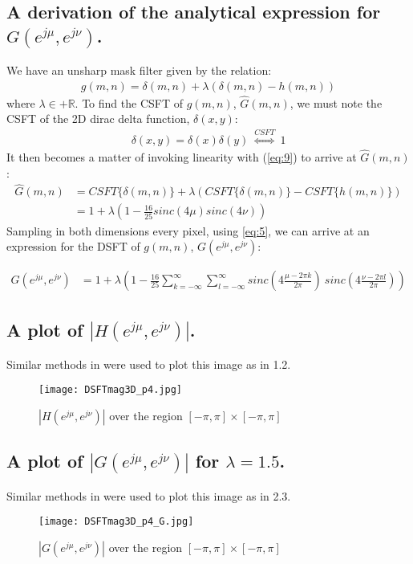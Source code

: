 \documentclass{article}
\begin{document}
\subsection{A derivation of the analytical expression for $G(e^{j \mu}, e^{j \nu})$.}
We have an unsharp mask filter given by the relation:
\begin{align}\label{eq:10}
    g(m,n) = \delta(m,n) + \lambda (\delta(m,n) - h(m,n))
\end{align}
where $\lambda \in \mathbb{+R}$. To find the CSFT of $g(m,n)$, $\hat{G}(m,n)$, we must note the CSFT of the 2D dirac delta function, $\delta(x,y)$:
\begin{align}\label{eq:11}
\delta(x,y) = \delta(x)\delta(y) \  \overset{CSFT}{\Longleftrightarrow} \ 1
\end{align}
It then becomes a matter of invoking linearity with (\ref{eq:9}) to arrive at $\hat{G}(m,n)$:
\begin{align*}
\hat{G}(m,n) &= CSFT\{\delta(m, n)\} + \lambda(CSFT\{\delta(m, n)\} - CSFT\{h(m,n)\}) \\
&= 1 + \lambda (1 - \frac{16}{25} sinc(4 \mu) sinc(4 \nu))
\end{align*}
Sampling in both dimensions every pixel, using \eqref{eq:5}, we can arrive at an expression for the DSFT of $g(m, n)$, $G(e^{j \mu}, e^{j \nu})$:
\begin{tcolorbox}[colback=red!5!white,colframe=red!75!black]
\begin{align}\label{eq:12}
G(e^{j \mu}, e^{j \nu}) &=  1 + \lambda(1 - \frac{16}{25} \sum_{k=-\infty}^{\infty} \sum_{l=-\infty}^{\infty} sinc(4 \frac{\mu - 2 \pi k}{2 \pi}) \ sinc(4 \frac{\nu - 2 \pi l}{2 \pi}))
\end{align}
\end{tcolorbox}
\newpage
\subsection{A plot of $|H(e^{j \mu}, e^{j \nu})|$.}
Similar methods in were used to plot this image as in 1.2.
\begin{figure}[h]
    \centering
    \texttt{[image: DSFTmag3D\_p4.jpg]}
    \caption{$|H(e^{j \mu}, e^{j \nu})|$ over the region $[-\pi,\pi] \times [-\pi,\pi]$}
    \label{fig:5}
\end{figure}
\newpage
\subsection{A plot of $|G(e^{j \mu}, e^{j \nu})|$ for $\lambda=1.5$.}
Similar methods in were used to plot this image as in 2.3.
\begin{figure}[h]
    \centering
    \texttt{[image: DSFTmag3D\_p4\_G.jpg]}
    \caption{$|G(e^{j \mu}, e^{j \nu})|$ over the region $[-\pi,\pi] \times [-\pi,\pi]$}
    \label{fig:6}
\end{figure}
\newpage
\end{document}
